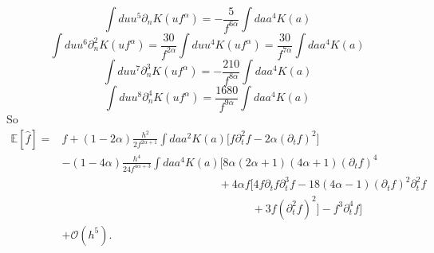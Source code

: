 \begin{equation}
	\int du u^5 \partial_nK(uf^\alpha )=-\frac{5}{f^{6\alpha}}\int da a^4 K(a)
\end{equation}
\begin{equation}
	\int du u^6 \partial_n^2K(uf^\alpha )=\frac{30}{f^{2\alpha}}\int du u^4 K(uf^\alpha )=\frac{30}{f^{7\alpha}}\int da a^4 K(a)
\end{equation}
\begin{equation}
	\int du u^7 \partial_n^3K(uf^\alpha )=-\frac{210}{f^{8\alpha}}\int da a^4 K(a)
\end{equation}
\begin{equation}
	\int du u^8 \partial_n^4K(uf^\alpha )=\frac{1680}{f^{9\alpha}}\int da a^4 K(a)
\end{equation}
So
\begin{equation}
	\begin{split}
		\mathbb{E}[\hat{f}]=&f+(1-2\alpha)\frac{h^2}{2f^{2\alpha+1}}\int da a^2K(a)\bigg[f\partial_t^2f-2\alpha(\partial_tf)^2\bigg]\\
		&-(1-4\alpha)\frac{h^4}{24f^{4\alpha +3}}\int da a^4 K(a)\bigg[8\alpha(2\alpha+1)(4\alpha+1)(\partial_tf)^4\\
		&\qquad\qquad\qquad\qquad\qquad\qquad\qquad+4\alpha f[4f\partial_tf \partial_t^3f-18(4\alpha-1)(\partial_tf)^2\partial_t^2f\\
		&\qquad\qquad\qquad\qquad\qquad\qquad\qquad\qquad\quad+3f(\partial_t^2f)^2]-f^3\partial_t^4f
		\bigg]\\
		&+\mathcal{O}(h^5).
	\end{split}
\end{equation}
